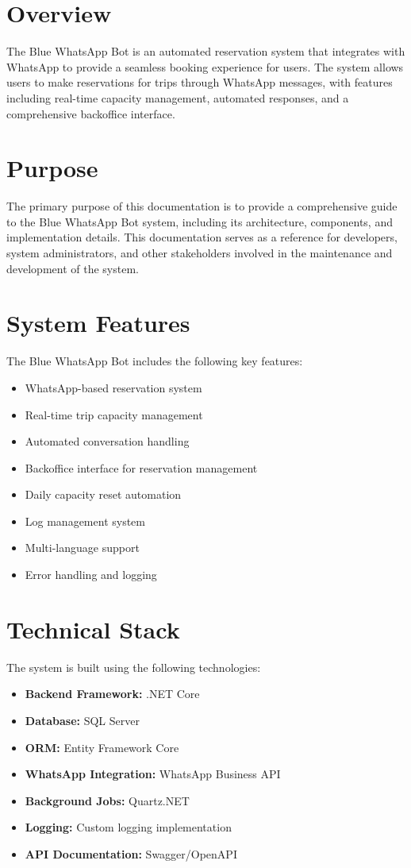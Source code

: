 \section{Overview}
The Blue WhatsApp Bot is an automated reservation system that integrates with WhatsApp to provide a seamless booking experience for users. The system allows users to make reservations for trips through WhatsApp messages, with features including real-time capacity management, automated responses, and a comprehensive backoffice interface.

\section{Purpose}
The primary purpose of this documentation is to provide a comprehensive guide to the Blue WhatsApp Bot system, including its architecture, components, and implementation details. This documentation serves as a reference for developers, system administrators, and other stakeholders involved in the maintenance and development of the system.

\section{System Features}
The Blue WhatsApp Bot includes the following key features:

\begin{itemize}
    \item WhatsApp-based reservation system
    \item Real-time trip capacity management
    \item Automated conversation handling
    \item Backoffice interface for reservation management
    \item Daily capacity reset automation
    \item Log management system
    \item Multi-language support
    \item Error handling and logging
\end{itemize}

\section{Technical Stack}
The system is built using the following technologies:

\begin{itemize}
    \item \textbf{Backend Framework:} .NET Core
    \item \textbf{Database:} SQL Server
    \item \textbf{ORM:} Entity Framework Core
    \item \textbf{WhatsApp Integration:} WhatsApp Business API
    \item \textbf{Background Jobs:} Quartz.NET
    \item \textbf{Logging:} Custom logging implementation
    \item \textbf{API Documentation:} Swagger/OpenAPI
\end{itemize}

